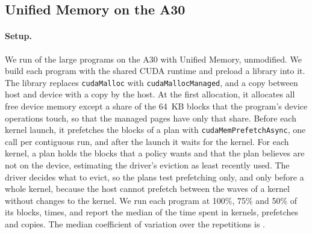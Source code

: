 \documentclass[11pt]{article}
\newcommand{\code}[1]{\texttt{#1}}
\begin{document}
\subsection{Unified Memory on the A30}
\label{sec:eval-hw}

\paragraph{Setup.} We run \numHwPrograms{} of the large programs on the A30 with Unified Memory, unmodified. We
build each program with the shared CUDA runtime and preload a library into it. The library replaces
\code{cudaMalloc} with \code{cudaMallocManaged}, and a copy between host and device with a copy by the host. At the
first allocation, it allocates all free device memory except a share of the 64~KB blocks that the program's device
operations touch, so that the managed pages have only that share. Before each kernel launch, it prefetches the
blocks of a plan with \code{cudaMemPrefetchAsync}, one call per contiguous run, and after the launch it waits for the
kernel. For each kernel, a plan holds the blocks that a policy wants and that the plan believes are not on the
device, estimating the driver's eviction as least recently used. The driver decides what to evict, so the plans test
prefetching only, and only before a whole kernel, because the host cannot prefetch between the waves of a kernel
without changes to the kernel. We run each program at 100\%, 75\% and 50\% of its blocks, \numHwReps{} times, and
report the median of the time spent in kernels, prefetches and copies. The median coefficient of variation over the
repetitions is \numHwCv{}.

\begin{table}[tbp]
\centering
\scriptsize
\setlength{\tabcolsep}{2pt}

\caption{The programs on the A30 with Unified Memory, at the smallest share of their 64~KB blocks at which every
operation fits ($^*$ where none below 100\% does): the time with demand paging, each plan's speedup over it, and the
speedup that the kernel-level model gives for the interpreter's runs. A dash marks a plan whose runs all failed, or
a share the model does not simulate.}
\label{tab:uvm-hw}
\end{table}
\end{document}
